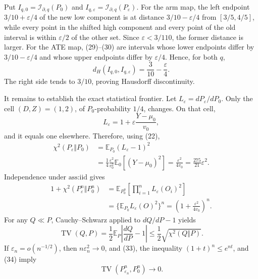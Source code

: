 Put \(I_{q,0}=\mathcal I_{\partial,q}(P_0)\) and \(I_{q,\varepsilon}=\mathcal I_{\partial,q}(P_\varepsilon)\).  For the arm map, the left endpoint \(3/10+\varepsilon/4\) of the new low component is at distance \(3/10-\varepsilon/4\) from \([3/5,4/5]\), while every point in the shifted high component and every point of the old interval is within \(\varepsilon/2\) of the other set.  Since \(\varepsilon<3/110\), the former distance is larger.  For the ATE map, (29)--(30) are intervals whose lower endpoints differ by \(3/10-\varepsilon/4\) and whose upper endpoints differ by \(\varepsilon/4\).  Hence, for both \(q\),
\[
 d_H(I_{q,0},I_{q,\varepsilon})
 =\frac3{10}-\frac{\varepsilon}{4}.                             \tag{31}
\]
The right side tends to \(3/10\), proving Hausdorff discontinuity.

It remains to establish the exact statistical frontier.  Let \(L_\varepsilon=dP_\varepsilon/dP_0\).  Only the cell \((D,Z)=(1,2)\), of \(P_0\)-probability \(1/4\), changes.  On that cell,
\[
 L_\varepsilon=1+\varepsilon\frac{Y-\mu_0}{v_0},
\]
and it equals one elsewhere.  Therefore, using (22),
\[
 \begin{aligned}
 \chi^2(P_\varepsilon\Vert P_0)
 &=\mathbb E_{P_0}(L_\varepsilon-1)^2\\
 &=\frac14\frac{\varepsilon^2}{v_0^2}
   \mathbb E_0[(Y-\mu_0)^2]
 =\frac{\varepsilon^2}{4v_0}
 =\frac{275}{21}\varepsilon^2.                                  \tag{32}
 \end{aligned}
\]
Independence under \(\text{ass:iid}\) gives
\[
 \begin{aligned}
 1+\chi^2(P_\varepsilon^n\Vert P_0^n)
 &=\mathbb E_{P_0^n}\left[\prod_{i=1}^nL_\varepsilon(O_i)^2\right]\\
 &=\{\mathbb E_{P_0}L_\varepsilon(O)^2\}^n
 =\left(1+\frac{\varepsilon^2}{4v_0}\right)^n.                   \tag{33}
 \end{aligned}
\]
For any \(Q\ll P\), Cauchy--Schwarz applied to \(dQ/dP-1\) yields
\[
 \operatorname{TV}(Q,P)
 =\frac12\mathbb E_P\left|\frac{dQ}{dP}-1\right|
 \le\frac12\sqrt{\chi^2(Q\Vert P)}.                             \tag{34}
\]
If \(\varepsilon_n=o(n^{-1/2})\), then \(n\varepsilon_n^2\to0\), and (33), the inequality \((1+t)^n\le e^{nt}\), and (34) imply
\[
 \operatorname{TV}(P_{\varepsilon_n}^n,P_0^n)\longrightarrow0.   \tag{34a}
\]

